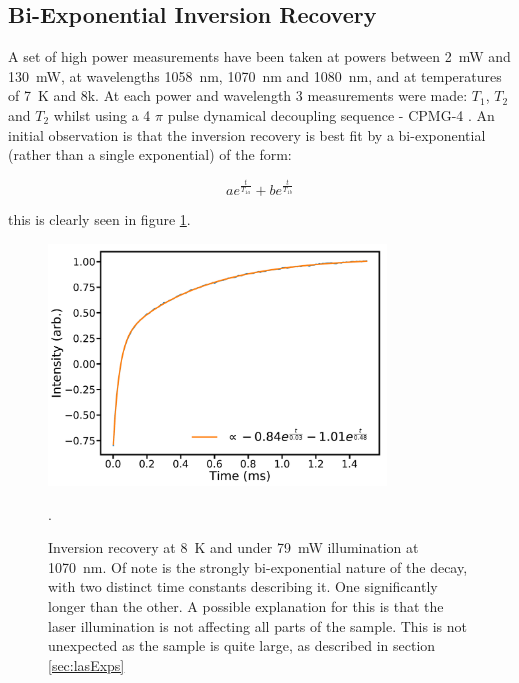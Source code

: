 \subsection{Bi-Exponential Inversion Recovery}

A set of high power measurements have been taken at powers between 2~mW and 130~mW, at wavelengths 1058~nm, 1070~nm and 1080~nm, and at temperatures of 7~K and 8k.
At each power and wavelength 3 measurements were made: $T_1$, $T_2$ and $T_2$ whilst using a 4 $\pi$ pulse dynamical decoupling sequence - CPMG-4 \cite{Carr1954}.
An initial observation is that the inversion recovery is best fit by a bi-exponential (rather than a single exponential) of the form:

\begin{equation}
a e^{\frac{t}{T_{1a}}} + b e^{\frac{t}{T_{1b}}}
\end{equation}

this is clearly seen in figure \ref{fig:biexpDec}.

\begin{figure}
\centering
\includegraphics[width=0.8\textwidth]{Figures/T1_biExp.pdf}
\caption[Inversion recovery under laser illumination]{Inversion recovery at 8~K and under 79~mW illumination at 1070~nm. Of note is the strongly bi-exponential nature of the decay, with two distinct time constants describing it. One significantly longer than the other. A possible explanation for this is that the laser illumination is not affecting all parts of the sample. This is not unexpected as the sample is quite large, as described in section \ref{sec:lasExps}}.
\label{fig:biexpDec}
\end{figure}

